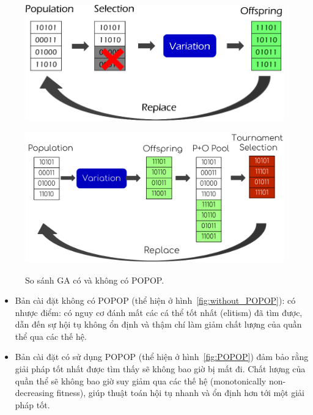 \documentclass{book}
\begin{document}
\begin{figure}[H]
    \centering
    \begin{minipage}[c]{0.45\textwidth}
        \centering
        \includegraphics[width=\linewidth]{images/without_POPOP.png}
        \label{fig:without_POPOP}
    \end{minipage}\hfill
    \begin{minipage}[c]{0.45\textwidth}
        \centering
        \includegraphics[width=\linewidth]{images/POPOP.png}
        \label{fig:POPOP}
    \end{minipage}
    \caption{So sánh GA có và không có POPOP.}
    \label{fig:ga_popop_comparison}
\end{figure}
\begin{itemize}
    \item Bản cài đặt không có POPOP (thể hiện ở hình~\ref{fig:without_POPOP}): có nhược điểm: có nguy cơ đánh mất các cá thể tốt nhất (elitism) đã tìm được, dẫn đến sự hội tụ không ổn định và thậm chí làm giảm chất lượng của quần thể qua các thế hệ.
    \item Bản cài đặt có sử dụng POPOP (thể hiện ở hình~\ref{fig:POPOP}) đảm bảo rằng giải pháp tốt nhất được tìm thấy sẽ không bao giờ bị mất đi. Chất lượng của quần thể sẽ không bao giờ suy giảm qua các thế hệ (monotonically non-decreasing fitness), giúp thuật toán hội tụ nhanh và ổn định hơn tới một giải pháp tốt.
\end{itemize}
\end{document}
